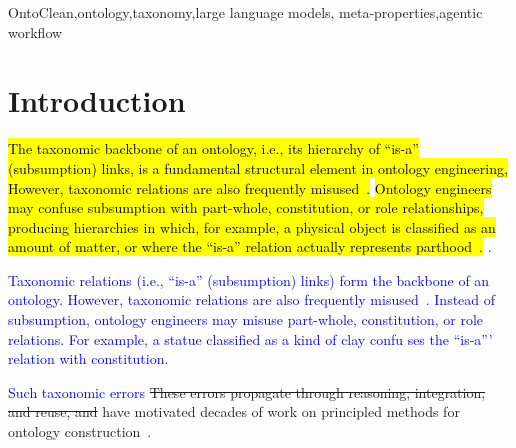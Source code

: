 \documentclass{IOS-Book-Article}
\def\hb{\hbox to 11.5 cm{}}
\begin{document}
\begin{frontmatter}
  \begin{keyword}
    OntoClean\sep ontology\sep taxonomy\sep large language models\sep
    meta-properties\sep agentic workflow
  \end{keyword}
\end{frontmatter}
\markboth{February 2026\hb}{February 2026\hb}

\section{Introduction}

\hl{The taxonomic backbone of an ontology, i.e., 
  its hierarchy of ``is-a'' (subsumption) links, is a fundamental
  structural element in ontology engineering, However, taxonomic
  relations are  also frequently
  misused~\cite{guarino2000formal}.}
\hl{Ontology engineers may confuse subsumption with part-whole, constitution,
  or role relationships, producing hierarchies in which, for example, a
  physical object is classified as an amount of matter, or where the
  ``is-a'' relation actually represents
  parthood~\cite{guarino2000formal,guarino2009ontoclean}.}
. 

\textcolor{blue}{Taxonomic relations (i.e., ``is-a'' (subsumption) links) form the backbone of an ontology.
  However, taxonomic relations are  also frequently misused~\cite{guarino2000formal}. Instead of subsumption, ontology engineers may misuse part-whole, constitution, or role relations. For example, a statue classified as a kind of clay confu ses the ``is-a''' relation with constitution.}

\textcolor{blue}{Such taxonomic errors} \st{These errors propagate through reasoning, integration, and reuse, and}
have motivated decades of work on principled methods for ontology
construction~\cite{guarino2009ontoclean}.
\end{document}
